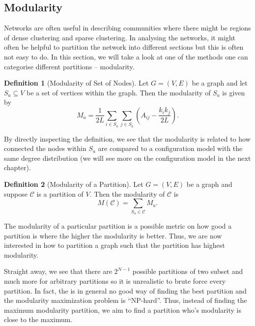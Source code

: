 \documentclass[
]{article}
\theoremstyle{definition}
\theoremstyle{definition}
\newtheorem{definition}{Definition}[section]
\begin{document}
\hypertarget{modularity}{%
\subsection{Modularity}\label{modularity}}

Networks are often useful in describing communities where there might be
regions of dense clustering and sparse clustering. In analysing the
networks, it might often be helpful to partition the network into
different sections but this is often not easy to do. In this section, we
will take a look at one of the methods one can categorise different
partitions -- modularity.

\begin{definition}[Modularity of Set of Nodes]
  Let \(G = (V, E)\) be a graph and let \(S_a \subseteq V\) be a set of vertices 
  within the graph. Then the modularity of \(S_a\) is given by 
  \[M_a = \frac{1}{2L} \sum_{i \in S_a} \sum_{j \in S_a} 
    \left(A_{ij} - \frac{k_i k_j}{2L}\right).\]
\end{definition}

By directly inspecting the definition, we see that the modularity is
related to how connected the nodes within \(S_a\) are compared to a
configuration model with the same degree distribution (we will see more
on the configuration model in the next chapter).

\begin{definition}[Modularity of a Partition]
  Let \(G = (V, E)\) be a graph and suppose \(\mathcal{C}\) is a partition of 
  \(V\). Then the modularity of \(\mathcal{C}\) is 
  \[M(\mathcal{C}) = \sum_{S_a \in \mathcal{C}} M_a.\]
\end{definition}

The modularity of a particular partition is a possible metric on how
good a partition is where the higher the modularity is better. Thus, we
are now interested in how to partition a graph such that the partition
has highest modularity.

Straight away, we see that there are \(2^{N - 1}\) possible partitions
of two subset and much more for arbitrary partitions so it is
unrealistic to brute force every partition. In fact, the is in general
no good way of finding the best partition and the modularity
maximization problem is ``NP-hard''. Thus, instead of finding the
maximum modularity partition, we aim to find a partition who's
modularity is close to the maximum.
\end{document}
